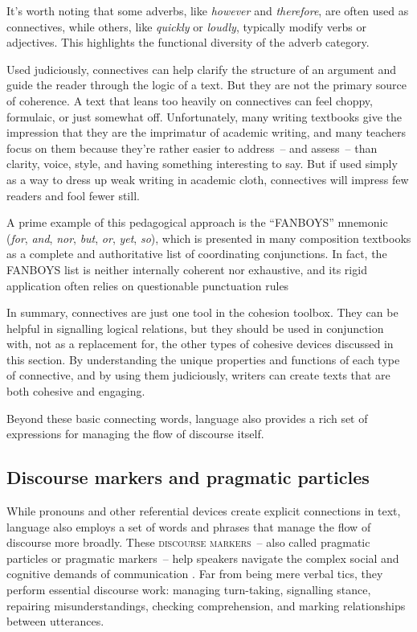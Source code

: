 It's worth noting that some adverbs, like \textit{however} and \textit{therefore}, are often used as connectives, while others, like \textit{quickly} or \textit{loudly}, typically modify verbs or adjectives. This highlights the functional diversity of the adverb category.

Used judiciously, connectives can help clarify the structure of an argument and guide the reader through the logic of a text. But they are not the primary source of coherence. A text that leans too heavily on connectives can feel choppy, formulaic, or just somewhat off.  Unfortunately, many writing textbooks give the impression that they are the imprimatur of academic writing, and many teachers focus on them because they're rather easier to address~-- and assess~-- than clarity, voice, style, and having something interesting to say. But if used simply as a way to dress up weak writing in academic cloth, connectives will impress few readers and fool fewer still.

A prime example of this pedagogical approach is the ``FANBOYS'' mnemonic (\textit{for}, \textit{and}, \textit{nor}, \textit{but}, \textit{or}, \textit{yet}, \textit{so}), which is presented in many composition textbooks as a complete and authoritative list of coordinating conjunctions. In fact, the FANBOYS list is neither internally coherent nor exhaustive, and its rigid application often relies on questionable punctuation rules \citep{Reynolds2011}

In summary, connectives are just one tool in the cohesion toolbox. They can be helpful in signalling logical relations, but they should be used in conjunction with, not as a replacement for, the other types of cohesive devices discussed in this section. By understanding the unique properties and functions of each type of connective, and by using them judiciously, writers can create texts that are both cohesive and engaging.

Beyond these basic connecting words, language also provides a rich set of expressions for managing the flow of discourse itself.

\subsection{Discourse markers and pragmatic particles}\label{sec:discourse-markers}

While pronouns and other referential devices create explicit connections in text, language also employs a set of words and phrases that manage the flow of discourse more broadly. These \textsc{discourse markers}~-- also called pragmatic particles or pragmatic markers~-- help speakers navigate the complex social and cognitive demands of communication \citep{Schiffrin1987}. Far from being mere verbal tics, they perform essential discourse work: managing turn-taking, signalling stance, repairing misunderstandings, checking comprehension, and marking relationships between utterances.

